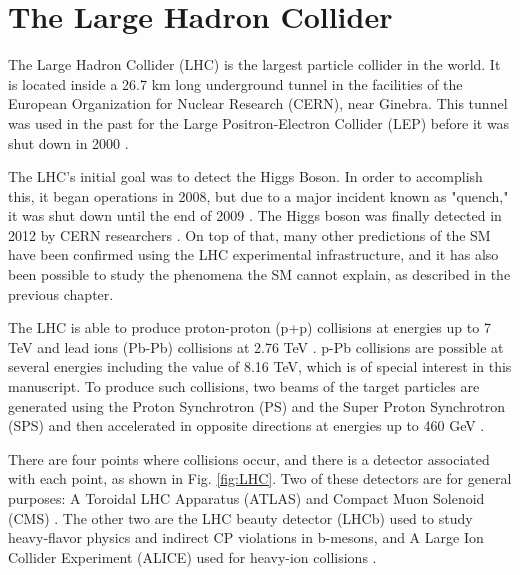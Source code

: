 \chapter{\leavevmode\newline The Large Hadron Collider}
\label{chap:chapter_2}

The Large Hadron Collider (LHC) is the largest particle collider in the world. It is located inside a 26.7 km long underground tunnel in the facilities of the European Organization for Nuclear Research (CERN), near Ginebra. This tunnel was used in the past for the Large Positron-Electron Collider (LEP) before it was shut down in 2000 \cite{stiller2016full, baron2018desarrollo}.

The LHC's initial goal was to detect the Higgs Boson. In order to accomplish this, it began operations in 2008, but due to a major incident known as "quench," it was shut down until the end of 2009 \cite{di2020measurement, oneill_2015}. The Higgs boson was finally detected in 2012 by CERN researchers \cite{cern_document_server_2012}. On top of that, many other predictions of the SM have been confirmed using the LHC experimental infrastructure, and it has also been possible to study the phenomena the SM cannot explain, as described in the previous chapter.

The LHC is able to produce proton-proton (p+p) collisions at energies up to 7 TeV and lead ions (Pb-Pb) collisions at 2.76 TeV \cite{stiller2016full}. p-Pb collisions are possible at several energies \cite{vovchenko2019canonical}  including the value of 8.16 TeV, which is of special interest in this manuscript. To produce such collisions, two beams of the target particles are generated using the Proton Synchrotron (PS) and the Super Proton Synchrotron (SPS) and then accelerated in opposite directions at energies up to 460 GeV \cite{grummer2021search, bragagnolo2021measurement, mejia2012medida}.

There are four points where collisions occur, and there is a detector associated with each point, as shown in Fig. \ref{fig:LHC}. Two of these detectors are for general purposes: A Toroidal LHC Apparatus (ATLAS) and Compact Muon Solenoid (CMS) \cite{bonanomi2021response, baron2018desarrollo}. The other two are the LHC beauty detector (LHCb) used to study heavy-flavor physics and indirect CP violations in b-mesons, and A Large Ion Collider Experiment (ALICE) used for heavy-ion collisions \cite{stiller2016full, bonanomi2021response}.

